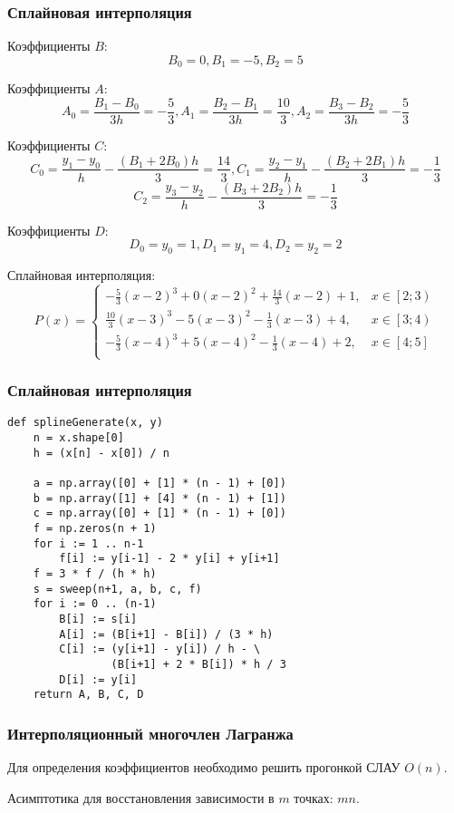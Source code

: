 \documentclass[10pt]{beamer}
\begin{document}
\begin{frame}[fragile]
\frametitle{Сплайновая интерполяция}

Коэффициенты $B$:
$$ B_0 = 0, B_1 = -5,  B_2 = 5$$

Коэффициенты $A$:
$$ A_0 = \frac{B_{1} - B_{0}}{3 h} = -\frac53,  A_1 = \frac{B_{2} - B_{1}}{3 h} = \frac{10}{3},  A_2 = \frac{B_{3} - B_{2}}{3 h} = -\frac{5}{3}$$

Коэффициенты $C$:
$$ C_0 = \frac{y_1 - y_0}{h} - \frac{(B_1 + 2 B_0) h}{3}= \frac{14}{3} ,  C_1 = \frac{y_2 - y_1}{h} - \frac{(B_2 + 2 B_1) h}{3} = -\frac13$$
$$C_2 = \frac{y_3 - y_2}{h} - \frac{(B_3 + 2 B_2) h}{3} = -\frac13$$

Коэффициенты $D$:
$$ D_0 = y_0 = 1,  D_1 = y_1 = 4,  D_2 = y_2 = 2$$

Сплайновая интерполяция:
$$
P(x) = 
\begin{cases}
-\frac{5}{3}(x-2)^3+0(x-2)^2 + \frac{14}{3}(x-2)+1, & x \in \left[2;3\right) \\
\frac{10}{3}\left(x-3\right)^3 - 5\left(x-3\right)^2 -\frac13\left(x-3\right) + 4,& x \in \left[3;4\right)	\\
-\frac{5}{3}\left(x-4\right)^3 + 5\left(x-4\right)^2 -\frac13\left(x-4\right) + 2,& x \in \left[4;5\right]	\\
\end{cases}
$$
\end{frame}

\begin{frame}[fragile]
\frametitle{Сплайновая интерполяция}

\begin{lstlisting}
def splineGenerate(x, y)
	n = x.shape[0]
    h = (x[n] - x[0]) / n

    a = np.array([0] + [1] * (n - 1) + [0])
    b = np.array([1] + [4] * (n - 1) + [1])
    c = np.array([0] + [1] * (n - 1) + [0])
    f = np.zeros(n + 1)
    for i := 1 .. n-1
        f[i] := y[i-1] - 2 * y[i] + y[i+1]
    f = 3 * f / (h * h)
    s = sweep(n+1, a, b, c, f)
    for i := 0 .. (n-1)
        B[i] := s[i]
        A[i] := (B[i+1] - B[i]) / (3 * h)
        C[i] := (y[i+1] - y[i]) / h - \
                (B[i+1] + 2 * B[i]) * h / 3
        D[i] := y[i]
    return A, B, C, D
\end{lstlisting}


\end{frame}

\begin{frame}[fragile]
\frametitle{Интерполяционный многочлен Лагранжа}

Для определения коэффициентов необходимо решить прогонкой СЛАУ $O(n)$. 

\vfill

Асимптотика для восстановления зависимости в $m$ точках: $m n$. 

\end{frame}
\end{document}
